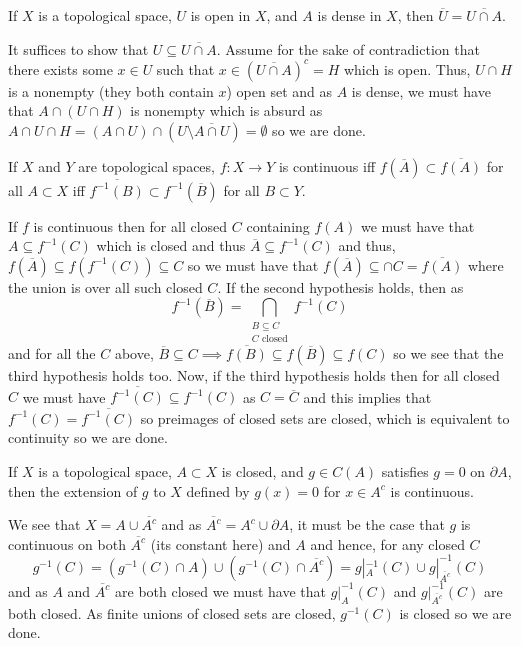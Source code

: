 \documentclass[12pt,a4paper]{article}
\begin{document}
\begin{problem}\label{prob:4-13}
If $X$ is a topological space, $U$ is open in $X$, and $A$ is dense in $X$, then $\overline{U} = \overline{U \cap A}$.
\end{problem}
\begin{solution}
    It suffices to show that $U\subseteq\overline{U\cap A}.$ 
    Assume for the sake of contradiction that there exists some $x\in U$ such that $x\in(\overline{U\cap A})^c=H$ which is open. 
    Thus, $U\cap H$ is a nonempty (they both contain $x$) open set and as $A$ is dense, we must have that $A\cap(U\cap H)$ is nonempty which is absurd as $A\cap U\cap H=(A\cap U)\cap(U\setminus\overline{A\cap U})=\emptyset$ so we are done. 
\end{solution}
\begin{problem}\label{prob:4-14}
If $X$ and $Y$ are topological spaces, $f : X \to Y$ is continuous iff $f(\overline{A}) \subset \overline{f(A)}$ for all $A \subset X$ iff $\overline{f^{-1}(B)} \subset f^{-1}(\overline{B})$ for all $B \subset Y$.
\end{problem}
\begin{solution}
    If $f$ is continuous then for all closed $C$ containing $f(A)$ we must have that $A\subseteq f^{-1}(C)$ which is closed and thus $ \overline{A} \subseteq f^{-1}(C)$ and thus, $f( \overline{A} )\subseteq f(f^{-1}(C))\subseteq C$ so we must have that $f( \overline{A}) \subseteq\cap C= \overline{f(A)}$ where the union is over all such closed $C.$ 
    If the second hypothesis holds, then as
    \[
        f^{-1}( \overline{B})=\bigcap_{\substack{B \subseteq C\\ C\text{ closed}}}f^{-1}(C)
    \]
    and for all the $C$ above, $\overline{B}\subseteq C\implies \overline{f(B)} \subseteq f( \overline{B}) \subseteq f(C)$ so we see that the third hypothesis holds too. 
    Now, if the third hypothesis holds then for all closed $C$ we must have $ \overline{f^{-1}(C)} \subseteq f^{-1}(C)$ as $C=\overline{C}$ and this implies that $f^{-1}(C)= \overline{f^{-1}(C)}$ so preimages of closed sets are closed, which is equivalent to continuity so we are done. 
\end{solution}
\begin{problem}\label{prob:4-15}
If $X$ is a topological space, $A \subset X$ is closed, and $g \in C(A)$ satisfies $g = 0$ on $\partial A$, then the extension of $g$ to $X$ defined by $g(x) = 0$ for $x \in A^c$ is continuous.
\end{problem}
\begin{solution}
    We see that $X=A\cup\overline{A^c}$ and as $ \overline{A^c}=A^c\cup\partial A$, it must be the case that $g$ is continuous on both $\overline{A^c}$ (its constant here) and $A$ and hence, for any closed $C$ 
    \[
        g^{-1}(C)=(g^{-1}(C)\cap A)\cup(g^{-1}(C)\cap\overline{A^c})=g|_{A}^{-1}(C)\cup g|_{\overline{A^c}}^{-1}(C)
    \]
    and as $A$ and $ \overline{A^c}$ are both closed we must have that $g|_{A}^{-1}(C)$ and $g|_{\overline{A^c}}^{-1}(C)$ are both closed. 
    As finite unions of closed sets are closed, $g^{-1}(C)$ is closed so we are done. 
\end{solution}
\end{document}
